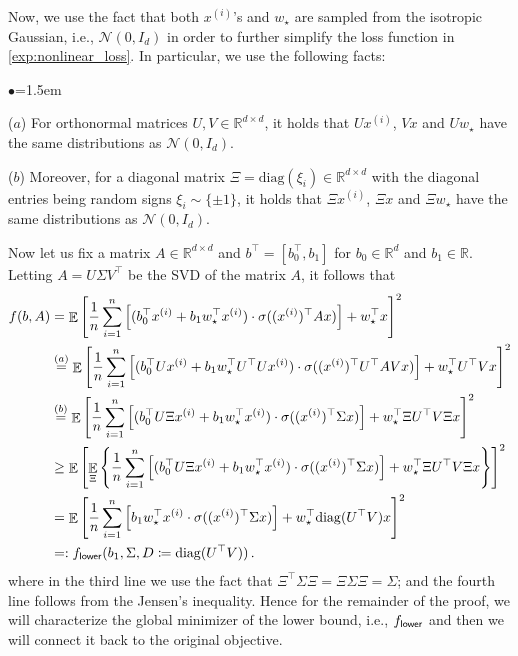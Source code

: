 \documentclass{article}
\DeclareMathOperator{\E}{\mathbb{E}}
\newcommand{\R}{\mathbb{R}}
\newcommand{\relu}{\sigma}
\newcommand{\bb}{A}
\newcommand{\cc}{b}
\newcommand{\wstar}{w_\star}
\newcommand{\tx}[1]{x^{(#1)}}
\newcommand{\ttf}{f_{\sf lower}}
\newcommand{\diag}{\mathrm{diag}}
\begin{document}
 
Now, we use the fact that both $\tx{i}$'s and $\wstar$ are sampled from the isotropic Gaussian, i.e., $\mathcal{N}(0, I_{d})$ in order to further simplify the loss function in \eqref{exp:nonlinear_loss}.
In particular, we use the following facts:
\begin{list}{$\bullet$}{\leftmargin=1.5em}
\setlength{\itemsep}{1pt}
    \item[($a$)] For orthonormal matrices $U,V \in \R^{d\times d}$, it holds that $U\tx{i}$, $Vx$ and $U\wstar$ have the same distributions as $\mathcal{N}(0, I_{d})$. 
    \item[($b$)] Moreover, for a diagonal matrix $\Xi = \diag(\xi_i) \in \R^{d\times d}$ with the diagonal entries being  random signs $\xi_i \sim \{\pm 1\}$, it holds that  $\Xi\tx{i}$, $\Xi x$ and $\Xi\wstar$ have the same distributions as $\mathcal{N}(0, I_{d})$.
\end{list}
Now let us fix a matrix $\bb\in\R^{d\times d}$ and $\cc^\top = [\cc_0^\top ,\cc_1]$ for $\cc_0\in \R^d$ and $\cc_1\in \R$. Letting $\bb= U\Sigma V^\top$ be the SVD of the matrix $A$, it follows that 
\begin{align}  
    f(\cc,\bb) &= \E \left[ \frac{1}{n}\sum_{i=1}^n \left[(\cc_0^\top\tx{i}+ \cc_1 \wstar^\top\tx{i} )\cdot \relu((\tx{i})^\top \bb x ) \right] + \wstar^\top x  \right]^2\\
    &\overset{(a)}{=}  \E \left[ \frac{1}{n}\sum_{i=1}^n \left[(\cc_0^\top U\tx{i}+ \cc_1 \wstar^\top U^\top U\tx{i})\cdot \relu((\tx{i})^\top U^\top \bb V x ) \right] + \wstar^\top U^\top Vx  \right]^2\\
    &\overset{(b)}{=}  \E \left[ \frac{1}{n}\sum_{i=1}^n \left[(\cc_0^\top U\Xi\tx{i}+ \cc_1 \wstar^\top\tx{i})\cdot \relu((\tx{i})^\top \Sigma x ) \right] +  \wstar^\top \Xi U^\top V\Xi x   \right]^2\\
    &\geq  \E \left[ \E_{\Xi}\left\{\frac{1}{n}\sum_{i=1}^n \left[(\cc_0^\top U\Xi\tx{i}+ \cc_1 \wstar^\top\tx{i})\cdot \relu((\tx{i})^\top \Sigma x ) \right] +  \wstar^\top \Xi U^\top V\Xi x  \right\} \right]^2\\
     &=  \E \left[  \frac{1}{n}\sum_{i=1}^n \left[\cc_1 \wstar^\top\tx{i}\cdot \relu((\tx{i})^\top \Sigma x ) \right] +  \wstar^\top \diag( U^\top V) x   \right]^2\\
     &=: \ttf(\cc_1,\Sigma, D \coloneqq \diag( U^\top V))\,. 
\end{align}
where in the third line we use the fact that $\Xi^
\top\Sigma \Xi= \Xi \Sigma \Xi = \Sigma$; and the fourth line follows from the Jensen's inequality.
Hence for the remainder of the proof, we will  characterize the global minimizer of the lower bound, i.e., $\ttf$ and then we will connect it back to the original objective.
\end{document}
